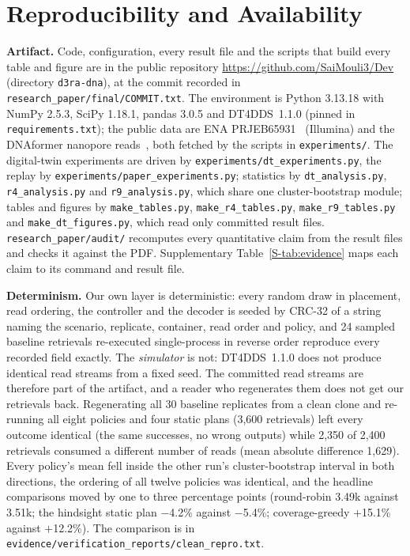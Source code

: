 \documentclass[conference,onecolumn,11pt]{IEEEtran}
\begin{document}
\section{Reproducibility and Availability}\label{sec:repro}
\textbf{Artifact.}  Code, configuration, every result file and the scripts that build every table and
figure are in the public repository \url{https://github.com/SaiMouli3/Dev} (directory
\texttt{d3ra-dna}), at the commit recorded in \texttt{research\_paper/final/COMMIT.txt}.  The environment
is Python 3.13.18 with NumPy 2.5.3, SciPy 1.18.1, pandas 3.0.5 and DT4DDS~1.1.0 (pinned in
\texttt{requirements.txt}); the public data are ENA PRJEB65931~\cite{gimpel2023prjeb65931} (Illumina) and
the DNAformer nanopore reads~\cite{technion2025dnaformerreads,barlev2024binned}, both fetched by the scripts
in \texttt{experiments/}.  The digital-twin experiments are driven by
\texttt{experiments/dt\_experiments.py}, the replay by \texttt{experiments/paper\_experiments.py};
statistics by \texttt{dt\_analysis.py}, \texttt{r4\_analysis.py} and \texttt{r9\_analysis.py}, which share
one cluster-bootstrap module; tables and figures by \texttt{make\_tables.py}, \texttt{make\_r4\_tables.py},
\texttt{make\_r9\_tables.py} and \texttt{make\_dt\_figures.py}, which read only committed result files.
\texttt{research\_paper/audit/} recomputes every quantitative claim from the result files and checks it
against the PDF.  Supplementary Table~\ref{S-tab:evidence} maps each claim to its command and result file.

\textbf{Determinism.}  Our own layer is deterministic: every random draw in placement, read ordering, the
controller and the decoder is seeded by CRC-32 of a string naming the scenario, replicate, container, read
order and policy, and 24 sampled baseline retrievals re-executed single-process in reverse order reproduce
every recorded field exactly.  The \emph{simulator} is not: DT4DDS~1.1.0 does not produce identical read
streams from a fixed seed.  The committed read streams are therefore part of the artifact, and a reader
who regenerates them does not get our retrievals back.  Regenerating all 30 baseline replicates from a
clean clone and re-running all eight policies and four static plans (3{,}600 retrievals) left every
outcome identical (the same successes, no wrong outputs) while 2{,}350 of 2{,}400 retrievals consumed a
different number of reads (mean absolute difference 1{,}629).  Every policy's mean fell inside the other
run's cluster-bootstrap interval in both directions, the ordering of all twelve policies was identical,
and the headline comparisons moved by one to three percentage points (round-robin 3.49k against 3.51k;
the hindsight static plan $-$4.2\% against $-$5.4\%; coverage-greedy $+$15.1\% against $+$12.2\%).  The
comparison is in \texttt{evidence/}\allowbreak\texttt{verification\_reports/}\allowbreak\texttt{clean\_repro.txt}.
\end{document}
